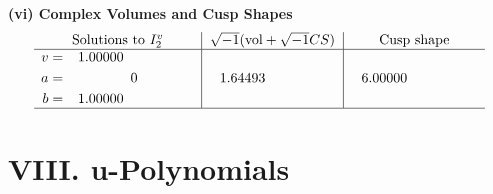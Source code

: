 \documentclass[1p]{elsarticle_modified}
\theoremstyle{definition}
\newcommand{\I}{\sqrt{-1}}
\begin{document}
\newpage\flushleft \textbf{(vi) Complex Volumes and Cusp Shapes}
$$\begin{array}{c|c|c}  
\text{Solutions to }I^v_{2}& \I (\text{vol} + \sqrt{-1}CS) & \text{Cusp shape}\\
 \hline 
\begin{aligned}
v &= \phantom{-}1.00000\phantom{ +0.000000I} \\
a &= \phantom{-0.000000 } 0 \\
b &= \phantom{-}1.00000\phantom{ +0.000000I}\end{aligned}
 & \phantom{-}1.64493\phantom{ +0.000000I} & \phantom{-}6.00000\phantom{ +0.000000I}\\
 \hline 
 \end{array}$$\newpage
\newpage\renewcommand{\arraystretch}{1}
\centering \section*{ VIII. u-Polynomials}
\end{document}
